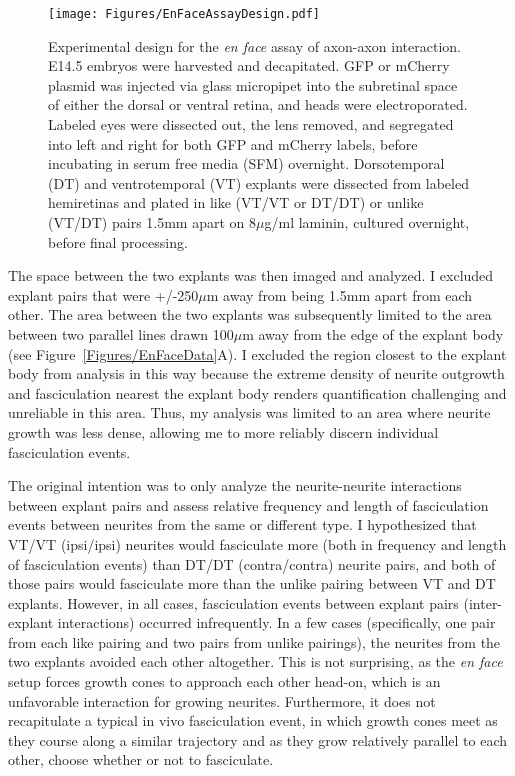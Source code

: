 \begin{figure}[hbtp]
    \begin{center}
        \texttt{[image: Figures/EnFaceAssayDesign.pdf]}
        \caption[Experimental design for the \emph{en face} assay of axon-axon interaction.]
        {Experimental design for the \emph{en face} assay of axon-axon interaction.
        E14.5 embryos were harvested and decapitated.
        GFP or mCherry plasmid was injected via glass micropipet into the subretinal space of either the dorsal or ventral retina, and heads were electroporated.
        Labeled eyes were dissected out, the lens removed, and segregated into left and right for both GFP and mCherry labels, before incubating in serum free media (SFM) overnight.
        Dorsotemporal (DT) and ventrotemporal (VT) explants were dissected from labeled hemiretinas and plated in like (VT/VT or DT/DT) or unlike (VT/DT) pairs 1.5mm apart on 8$\mu$g/ml laminin, cultured overnight, before final processing.
        }
        \label{Figures/EnFaceAssayDesign}
    \end{center}
\end{figure}
The space between the two explants was then imaged and analyzed.
I excluded explant pairs that were +/-250$\mu$m away from being 1.5mm apart from each other.
The area between the two explants was subsequently limited to the area between two parallel lines drawn 100$\mu$m away from the edge of the explant body (see Figure~\ref{Figures/EnFaceData}A).
I excluded the region closest to the explant body from analysis in this way because the extreme density of neurite outgrowth and fasciculation nearest the explant body renders quantification challenging and unreliable in this area.
Thus, my analysis was limited to an area where neurite growth was less dense, allowing me to more reliably discern individual fasciculation events.

The original intention was to only analyze the neurite-neurite interactions between explant pairs and assess relative frequency and length of fasciculation events between neurites from the same or different type.
I hypothesized that VT/VT (ipsi/ipsi) neurites would fasciculate more (both in frequency and length of fasciculation events) than DT/DT (contra/contra) neurite pairs, and both of those pairs would fasciculate more than the unlike pairing between VT and DT explants.
However, in all cases, fasciculation events between explant pairs (inter-explant interactions) occurred infrequently.
In a few cases (specifically, one pair from each like pairing and two pairs from unlike pairings), the neurites from the two explants avoided each other altogether.
This is not surprising, as the \emph{en face} setup forces growth cones to approach each other head-on, which is an unfavorable interaction for growing neurites.
Furthermore, it does not recapitulate a typical in vivo fasciculation event, in which growth cones meet as they course along a similar trajectory and as they grow relatively parallel to each other, choose whether or not to fasciculate.

